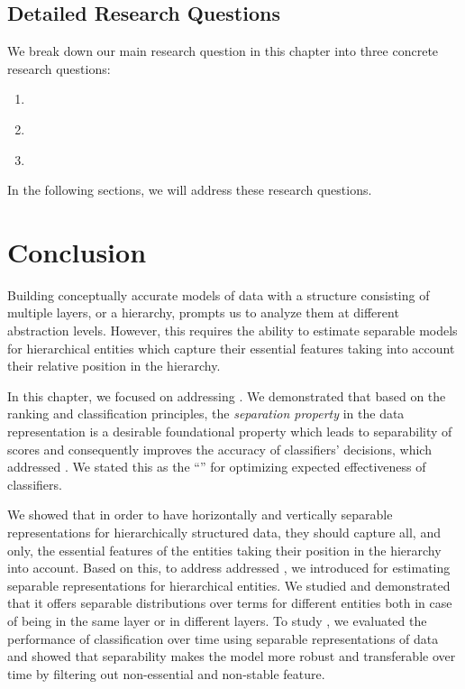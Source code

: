\subsection{Detailed Research Questions}
We break down our main research question in this chapter into three concrete research questions:
\begin{resqbox}
\begin{enumerate}
\item[\textbf{\resqname{c3.1}}] \emph{}
\item[\textbf{\resqname{c3.2}}] \emph{}
\item[\textbf{\resqname{c3.3}}] \emph{}
\end{enumerate}
\end{resqbox}
In the following sections, we will address these research questions.







\section{Conclusion}
Building conceptually accurate models of data with a structure consisting of multiple layers, or a hierarchy, prompts us to analyze them at different abstraction levels.  However, this requires the ability to estimate separable models for hierarchical entities which capture their essential features taking into account their relative position in the hierarchy. 

In this chapter, we focused on addressing \textbf{}. We demonstrated that based on the ranking and classification principles, the \emph{separation property} in the data representation is a desirable foundational property which leads to separability of scores and consequently improves the accuracy of classifiers' decisions, which addressed \textbf{}.  We stated this as the ``\ssp'' for optimizing expected effectiveness of classifiers.

We showed that in order to have horizontally and vertically separable representations for hierarchically structured data, they should capture all, and only, the essential features of the entities taking their position in the hierarchy into account. Based on this, to address addressed \textbf{}, we introduced \hswlms for estimating separable representations for hierarchical entities. We studied \achswlm and demonstrated that it offers separable distributions over terms for different entities both in case of being in the same layer or in different layers.  To study \textbf{}, we evaluated the performance of classification over time using separable representations of data and showed that separability makes the model more robust and transferable over time by filtering out non-essential and non-stable feature.

